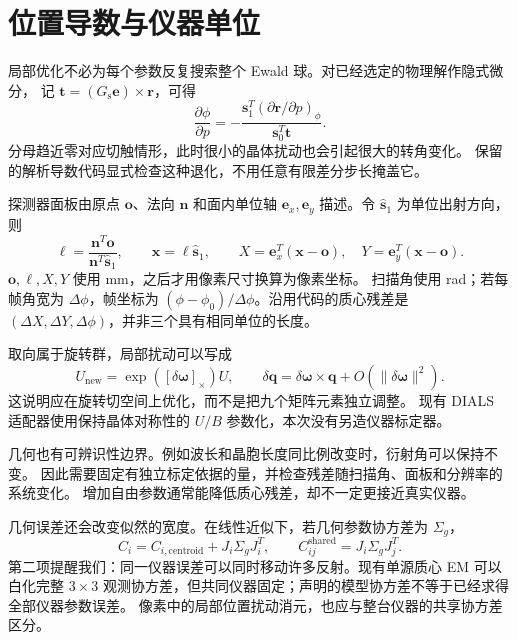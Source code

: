 \section{位置导数与仪器单位}

局部优化不必为每个参数反复搜索整个 Ewald 球。对已经选定的物理解作隐式微分，
记 $\bm t=(G_{\mathrm s}\bm e)\times\bm r$，可得
\begin{equation}
 \frac{\partial\phi}{\partial p}
 =-\frac{\bm s_1^T(\partial\bm r/\partial p)_{\phi}}
          {\bm s_0^T\bm t}.
 \label{eq:geometry-phi-derivative}
\end{equation}
分母趋近零对应切触情形，此时很小的晶体扰动也会引起很大的转角变化。
保留的解析导数代码显式检查这种退化，不用任意有限差分步长掩盖它。

探测器面板由原点 $\bm o$、法向 $\bm n$ 和面内单位轴
$\bm e_x,\bm e_y$ 描述。令 $\widehat{\bm s}_1$ 为单位出射方向，则
\begin{equation}
 \ell=\frac{\bm n^T\bm o}{\bm n^T\widehat{\bm s}_1},\qquad
 \bm x=\ell\widehat{\bm s}_1,\qquad
 X=\bm e_x^T(\bm x-\bm o),\quad
 Y=\bm e_y^T(\bm x-\bm o).
 \label{eq:geometry-detector}
\end{equation}
$\bm o,\ell,X,Y$ 使用 mm，之后才用像素尺寸换算为像素坐标。
扫描角使用 rad；若每帧角宽为 $\Delta\phi$，帧坐标为
$(\phi-\phi_0)/\Delta\phi$。沿用代码的质心残差是
$(\Delta X,\Delta Y,\Delta\phi)$，并非三个具有相同单位的长度。

取向属于旋转群，局部扰动可以写成
\begin{equation}
 U_{\mathrm{new}}=\exp([\delta\bm\omega]_\times)U,
 \qquad \delta\bm q=\delta\bm\omega\times\bm q+O(\|\delta\bm\omega\|^2).
 \label{eq:geometry-so3}
\end{equation}
这说明应在旋转切空间上优化，而不是把九个矩阵元素独立调整。
现有 DIALS 适配器使用保持晶体对称性的 $U/B$ 参数化，本次没有另造仪器标定器。

几何也有可辨识性边界。例如波长和晶胞长度同比例改变时，衍射角可以保持不变。
因此需要固定有独立标定依据的量，并检查残差随扫描角、面板和分辨率的系统变化。
增加自由参数通常能降低质心残差，却不一定更接近真实仪器。

几何误差还会改变似然的宽度。在线性近似下，若几何参数协方差为 $\Sigma_g$，
\begin{equation}
 C_i=C_{i,\mathrm{centroid}}+J_i\Sigma_gJ_i^T,
 \qquad C_{ij}^{\mathrm{shared}}=J_i\Sigma_gJ_j^T.
 \label{eq:geometry-covariance}
\end{equation}
第二项提醒我们：同一仪器误差可以同时移动许多反射。现有单源质心 EM 可以白化完整
$3\times3$ 观测协方差，但共同仪器固定；声明的模型协方差不等于已经求得全部仪器参数误差。
像素中的局部位置扰动消元，也应与整台仪器的共享协方差区分。

